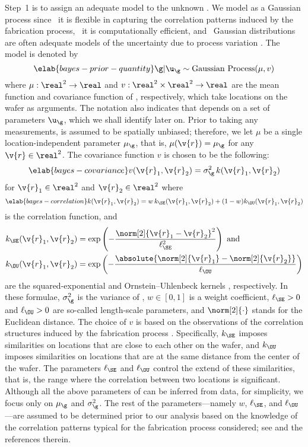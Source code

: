Step~1 is to assign an adequate model to the unknown \g. We model \g as a
Gaussian process \cite{rasmussen2006} since \one~it is flexible in capturing the
correlation patterns induced by the fabrication process, \two~it is
computationally efficient, and \three~Gaussian distributions are often adequate
models of the uncertainty due to process variation \cite{reda2009,
srivastava2010, juan2012}. The model is denoted by
\begin{equation} \elab{bayes-prior-quantity}
  \g | \u_\g \sim \mathrm{Gaussian\ Process}(\mu, v)
\end{equation}
where $\mu: \real^2 \to \real$ and $v: \real^2 \times \real^2 \to \real$ are the
mean function and covariance function of \g, respectively, which take locations
on the wafer as arguments. The notation also indicates that \g depends on a set
of parameters $\u_\g$, which we shall identify later on. Prior to taking any
measurements, \g is assumed to be spatially unbiased; therefore, we let $\mu$ be
a single location-independent parameter $\mu_\g$, that is, $\mu(\v{r}) = \mu_\g$
for any $\v{r} \in \real^2$. The covariance function $v$ is chosen to be the
following:
\begin{equation} \elab{bayes-covariance}
  v(\v{r}_1, \v{r}_2) = \sigma_\g^2 \, k(\v{r}_1, \v{r}_2)
\end{equation}
for $\v{r}_1 \in \real^2$ and $\v{r}_2 \in \real^2$ where
\begin{equation} \elab{bayes-correlation}
  k(\v{r}_1, \v{r}_2) = w \, k_\SE(\v{r}_1, \v{r}_2) + (1 - w) k_\OU(\v{r}_1, \v{r}_2)
\end{equation}
is the correlation function, and
\begin{align*}
  k_\SE(\v{r}_1, \v{r}_2) & = \exp\left(-\frac{\norm[2]{\v{r}_1 - \v{r}_2}^2}{\ell_\SE^2}\right) \text{ and} \\
  k_\OU(\v{r}_1, \v{r}_2) & = \exp\left(-\frac{\absolute{\norm[2]{\v{r}_1} - \norm[2]{\v{r}_2}}}{\ell_\OU}\right)
\end{align*}
are the squared-exponential and Ornstein--Uhlenbeck kernels
\cite{rasmussen2006}, respectively. In these formulae, $\sigma_\g^2$ is the
variance of \g, $w \in [0, 1]$ is a weight coefficient, $\ell_\SE > 0$ and
$\ell_\OU > 0$ are so-called length-scale parameters, and $\norm[2]{\cdot}$
stands for the Euclidean distance. The choice of $v$ is based on the
observations of the correlation structures induced by the fabrication process
\cite{chandrakasan2000, cheng2011}. Specifically, $k_\SE$ imposes similarities
on locations that are close to each other on the wafer, and $k_\OU$ imposes
similarities on locations that are at the same distance from the center of the
wafer. The parameters $\ell_\SE$ and $\ell_\OU$ control the extend of these
similarities, that is, the range where the correlation between two locations is
significant. Although all the above parameters of \g can be inferred from data,
for simplicity, we focus only on $\mu_\g$ and $\sigma_\g^2$. The rest of the
parameters---namely $w$, $\ell_\SE$, and $\ell_\OU$---are assumed to be
determined prior to our analysis based on the knowledge of the correlation
patterns typical for the fabrication process considered; see \cite{marzouk2009}
and the references therein.


